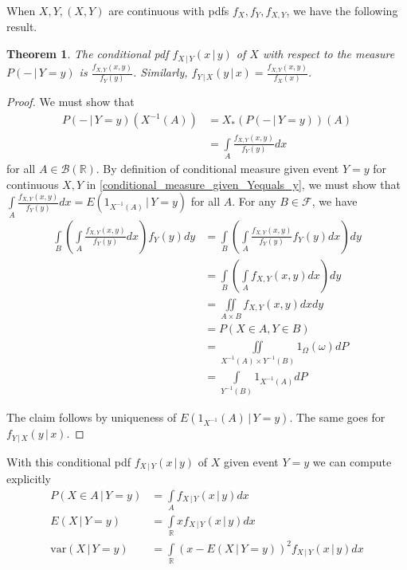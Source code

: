 \documentclass[12pt]{amsart}
\newtheorem{theorem}{Theorem}[section]
\theoremstyle{definition}
\begin{document}
When $X, Y, (X, Y)$ are continuous with pdfs $f_X, f_Y, f_{X, Y}$, we have the following result.
\begin{theorem} \label{conditional_pdf_for_joint_continuous_XY} The conditional pdf $f_{X \,|\, Y}(x \,|\, y)$ of $X$ with respect to the measure $P( - \,|\, Y = y)$ is $\frac{f_{X, Y}(x, y)}{f_Y(y)}$. Similarly, $f_{Y \,|\, X}(y \,|\, x) = \frac{f_{X, Y}(x, y)}{f_X(x)}$.
\end{theorem}
\begin{proof} We must show that
\begin{align*}
P(- \,|\, Y = y)(X^{-1}(A)) & = X_*(P( - \,|\, Y = y))(A) \\
 & = \int\limits_A \frac{f_{X, Y}(x, y)}{f_Y(y)} dx
\end{align*}
for all $A \in \mathcal{B}(\mathbb{R})$. By definition of conditional measure given event $Y = y$ for continuous $X, Y$ in \ref{conditional_measure_given_Yequals_y}, we must show that $\int\limits_A \frac{f_{X, Y}(x, y)}{f_Y(y)} dx = E(1_{X^{-1}(A)} \,|\, Y = y)$ for all $A$. For any $B \in \mathcal{F}$, we have
\begin{align*}
\int\limits_B \left( \int\limits_A \frac{f_{X, Y}(x, y)}{f_Y(y)}dx \right) f_Y(y) dy & = \int\limits_B \left( \int\limits_A \frac{f_{X, Y}(x, y)}{f_Y(y)} f_Y(y) dx \right) dy \\
 & = \int\limits_B \left( \int\limits_A f_{X, Y}(x, y)dx \right) dy \\
 & = \iint\limits_{A \times B} f_{X, Y}(x, y) dx dy \\
 & = P(X \in A, Y \in B) \\
 & = \iint\limits_{X^{-1}(A) \times Y^{-1}(B)} 1_{\Omega}(\omega) dP \\
 & = \int\limits_{Y^{-1}(B)} 1_{X^{-1}(A)} dP
\end{align*}

The claim follows by uniqueness of $E(1_{X^{-1}}(A) \,|\, Y = y)$. The same goes for $f_{Y \,|\, X}(y \,|\, x)$.
\end{proof}

With this conditional pdf $f_{X \,|\, Y}(x \,|\, y)$ of $X$ given event $Y = y$ we can compute explicitly
\begin{align*}
P(X \in A \,|\, Y = y) & = \int\limits_A f_{X \,|\, Y}(x \,|\, y) dx \\
E(X \,|\, Y = y) & = \int\limits_{\mathbb{R}} x f_{X \,|\, Y}(x \,|\, y) dx \\
\text{var}(X \,|\, Y = y) & = \int\limits_{\mathbb{R}} (x - E(X \,|\, Y = y))^2 f_{X \,|\, Y}(x \,|\, y)dx
\end{align*}
\end{document}
